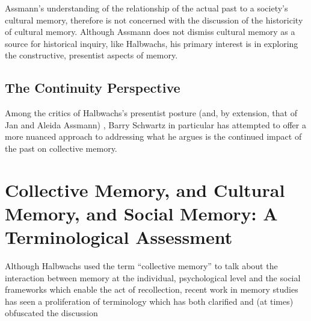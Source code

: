 Assmann's understanding of the relationship of the actual past to a
society's cultural memory, therefore is not concerned with the
discussion of the historicity of cultural memory. Although Assmann does
not dismiss cultural memory as a source for historical inquiry, like
Halbwachs, his primary interest is in exploring the constructive,
presentist aspects of memory.

\hypertarget{the-continuity-perspective}{%
\subsection{The Continuity
Perspective}\label{the-continuity-perspective}}

Among the critics of Halbwachs's presentist posture (and, by extension,
that of Jan and Aleida Assmann) , Barry Schwartz in particular has
attempted to offer a more nuanced approach to addressing what he argues
is the continued impact of the past on collective
memory.\autocites[Schwartz has made numerous contributions to the field
of memory studies. See
esp.][]{schwartz_sf1982}{schwartz_asr1991}[and][]{schwartz2000}[Note
also the SBL volume specifically interacting with his
work:][]{thatcher2014}

\hypertarget{collective-memory-and-cultural-memory-and-social-memory-a-terminological-assessment}{%
\section{Collective Memory, and Cultural Memory, and Social Memory: A
Terminological
Assessment}\label{collective-memory-and-cultural-memory-and-social-memory-a-terminological-assessment}}

Although Halbwachs used the term ``collective memory'' to talk about the
interaction between memory at the individual, psychological level and
the social frameworks which enable the act of recollection, recent work
in memory studies has seen a proliferation of terminology which has both
clarified and (at times) obfuscated the discussion

